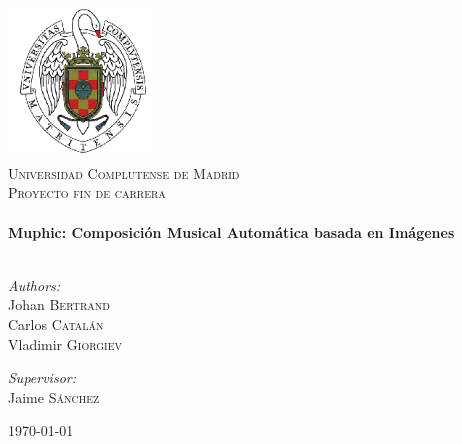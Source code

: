 \maketitle

\begin{titlepage}

\begin{center}


\includegraphics[width=0.3\textwidth]{./graphics/escudo-ucm.png}\\[1cm]    

\textsc{\LARGE Universidad Complutense de Madrid}\\[1.5cm]

\textsc{\Large Proyecto fin de carrera}\\[0.5cm]


\HRule \\[0.4cm]
{ \huge \bfseries Muphic: Composición Musical Automática basada en Imágenes}\\[0.4cm]

\HRule \\[1.5cm]

\begin{minipage}{0.4\textwidth}
\begin{flushleft} \large
\emph{Authors:}\\
Johan \textsc{Bertrand}\\
Carlos \textsc{Catalán}\\
Vladimir \textsc{Giorgiev}
\end{flushleft}
\end{minipage}
\begin{minipage}{0.4\textwidth}
\begin{flushright} \large
\emph{Supervisor:} \\
Jaime \textsc{Sánchez}
\end{flushright}
\end{minipage}

\vfill

{\large \today}

\end{center}

\end{titlepage}

